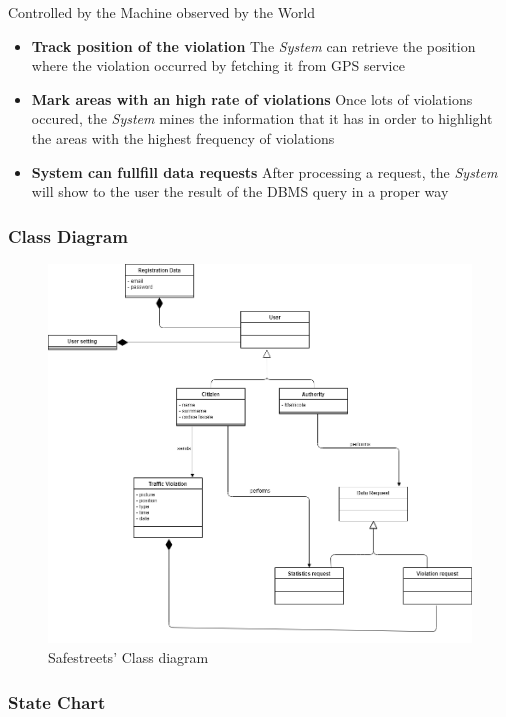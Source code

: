 \documentclass{article}
\begin{document}
Controlled by the Machine observed by the World
\begin{itemize}
    \item\textbf{Track position of the violation}
    The \textit{System} can retrieve the position where the violation occurred by fetching it from GPS service
    \item\textbf{Mark areas with an high rate of violations}
    Once lots of violations occured, the \textit{System} mines the information that it has in order to highlight the areas with the highest frequency of violations
    \item\textbf{System can fullfill data requests}
    After processing a request, the \textit{System} will show to the user the result of the DBMS query in a proper way

\end{itemize}

\subsubsection{Class Diagram} 

\begin{figure}[h!]
    \centering
    \includegraphics[scale=0.3]{img/Class_Diagram.png}
    \caption{Safestreets' Class diagram}
\end{figure}

\subsubsection{State Chart} 
\end{document}
